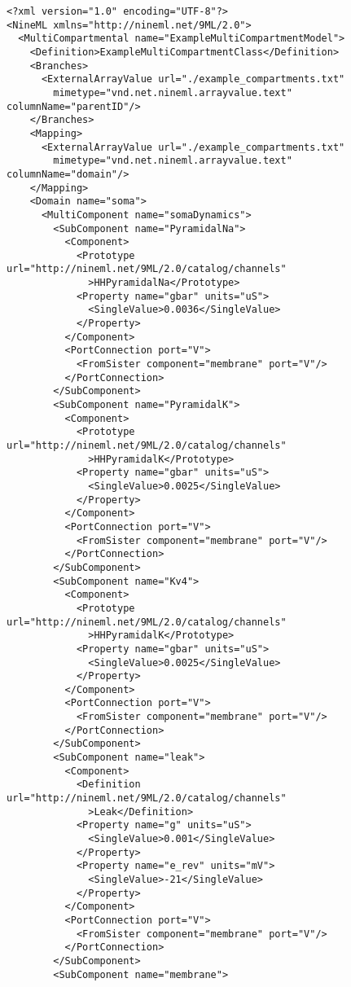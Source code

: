 \documentclass[draftspec]{ninemlspec}
\begin{document}
\begin{lstlisting}
<?xml version="1.0" encoding="UTF-8"?>
<NineML xmlns="http://nineml.net/9ML/2.0">
  <MultiCompartmental name="ExampleMultiCompartmentModel">
    <Definition>ExampleMultiCompartmentClass</Definition>
    <Branches>
      <ExternalArrayValue url="./example_compartments.txt"
        mimetype="vnd.net.nineml.arrayvalue.text" columnName="parentID"/>
    </Branches>
    <Mapping>
      <ExternalArrayValue url="./example_compartments.txt"
        mimetype="vnd.net.nineml.arrayvalue.text" columnName="domain"/>
    </Mapping>
    <Domain name="soma">
      <MultiComponent name="somaDynamics">
        <SubComponent name="PyramidalNa">
          <Component>
            <Prototype url="http://nineml.net/9ML/2.0/catalog/channels"
              >HHPyramidalNa</Prototype>
            <Property name="gbar" units="uS">
              <SingleValue>0.0036</SingleValue>
            </Property>
          </Component>
          <PortConnection port="V">
            <FromSister component="membrane" port="V"/>
          </PortConnection>
        </SubComponent>
        <SubComponent name="PyramidalK">
          <Component>
            <Prototype url="http://nineml.net/9ML/2.0/catalog/channels"
              >HHPyramidalK</Prototype>
            <Property name="gbar" units="uS">
              <SingleValue>0.0025</SingleValue>
            </Property>
          </Component>
          <PortConnection port="V">
            <FromSister component="membrane" port="V"/>
          </PortConnection>
        </SubComponent>
        <SubComponent name="Kv4">
          <Component>
            <Prototype url="http://nineml.net/9ML/2.0/catalog/channels"
              >HHPyramidalK</Prototype>
            <Property name="gbar" units="uS">
              <SingleValue>0.0025</SingleValue>
            </Property>
          </Component>
          <PortConnection port="V">
            <FromSister component="membrane" port="V"/>
          </PortConnection>
        </SubComponent>
        <SubComponent name="leak">
          <Component>
            <Definition url="http://nineml.net/9ML/2.0/catalog/channels"
              >Leak</Definition>
            <Property name="g" units="uS">
              <SingleValue>0.001</SingleValue>
            </Property>
            <Property name="e_rev" units="mV">
              <SingleValue>-21</SingleValue>
            </Property>
          </Component>
          <PortConnection port="V">
            <FromSister component="membrane" port="V"/>
          </PortConnection>
        </SubComponent>
        <SubComponent name="membrane">

\end{lstlisting}
\end{document}
